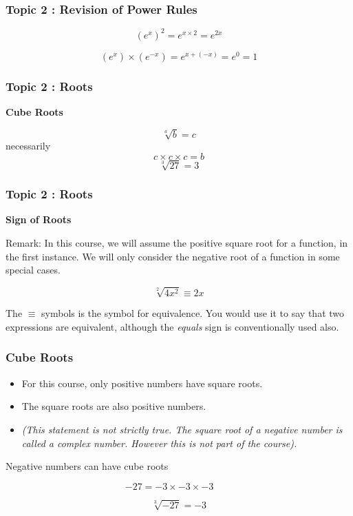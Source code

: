 \documentclass{beamer}
\begin{document}
\begin{frame}
	\frametitle{Topic 2 : Revision of Power Rules}
	{
		\Large
		\[ (e^x)^2 = e^{x \times 2}  = e^{2x} \]
	}
	
	{
		\Large
		\[ (e^x) \times (e^{-x}) = e^{x + (-x)}  = e^{0} = 1 \]
	}
\end{frame}
\begin{frame}
	\frametitle{Topic 2 : Roots}
	\textbf{Cube Roots}
	
	\[  \sqrt[a]{b} = c \]  necessarily \[ c \times c \times c = b \]
	\[  \sqrt[3]{27} = 3 \]
\end{frame}
\begin{frame}
	\frametitle{Topic 2 : Roots}
	\textbf{Sign of Roots}
		
	Remark: In this course, we will assume the positive square root for a function, in the first instance.
	We will only consider the negative root of a function in some special cases.
	
	
	\[ \sqrt[2]{4x^2} \equiv 2x \]
	
	The $\equiv$ symbols is the symbol for equivalence. You would use it to say that two expressions are equivalent, although the \textit{equals} sign is conventionally used also.
	
\end{frame}
\begin{frame}
	\frametitle{Cube Roots}
		\begin{itemize}
		\item For this course, only positive numbers have square roots. 
		\item The square roots are also positive numbers. 
		\item \textit{(This statement is not strictly true. The square root of a negative number is called a complex number. However this is not part of the course).}
	\end{itemize}
\end{frame}
\begin{frame}
	Negative numbers can have cube roots
	
	{
		\Large
		\[ -27 = -3 \times -3 \times -3 \qquad \]
		
		\[ \sqrt[3]{-27} = -3 \]
	}
\end{frame}
\end{document}

